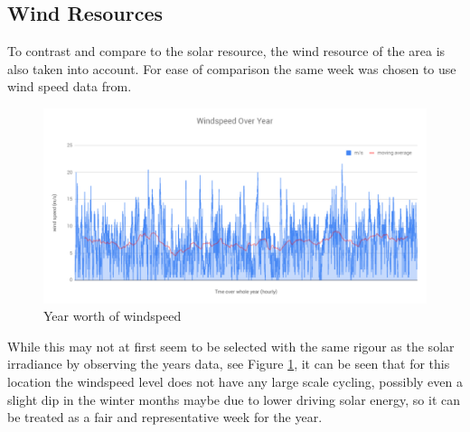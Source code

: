 \documentclass[journal]{IEEEtran}
\begin{document}
        \subsection{Wind Resources}
        To contrast and compare to the solar resource, the wind resource of the area is also taken into account. For ease of comparison the same week was chosen to use wind speed data from. 
        \begin{figure}[h!]
                \centering
                \includegraphics[width=0.75\linewidth]{fig/yearws.png}
                \caption{Year worth of windspeed}
                \label{yearwind}
        \end{figure}
        While this may not at first seem to be selected with the same rigour as the solar irradiance by observing the years data, see Figure \ref{yearwind}, it can be seen that for this location the windspeed level does not have any large scale cycling, possibly even a slight dip in the winter months maybe due to lower driving solar energy, so it can be treated as a fair and representative week for the year.
        
\end{document}
